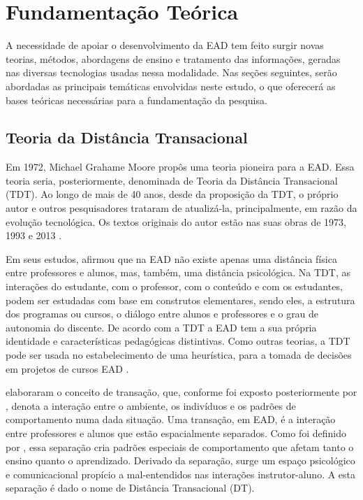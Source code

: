\chapter{Fundamentação Teórica}

A necessidade de apoiar o desenvolvimento da EAD tem feito surgir novas teorias,
métodos, abordagens de ensino e tratamento das informações, geradas nas diversas
tecnologias usadas nessa modalidade. Nas seções seguintes, serão abordadas as
principais temáticas envolvidas neste estudo, o que oferecerá as bases teóricas
necessárias para a fundamentação da pesquisa.

\section{Teoria da Distância Transacional}

Em 1972, Michael Grahame Moore propôs uma teoria pioneira para a EAD. Essa
teoria seria, posteriormente, denominada de Teoria da Distância Transacional
(TDT). Ao longo de mais de 40 anos, desde da proposição da TDT, o próprio
autor e outros pesquisadores trataram de atualizá-la, principalmente, em razão
da evolução tecnológica. Os textos originais do autor estão nas suas obras de
1973, 1993 e 2013 \cite{moore1973transational}.

Em seus estudos,  afirmou que na EAD não existe
apenas uma distância física entre professores e alunos, mas, também, uma
distância psicológica. Na TDT, as interações do estudante, com o professor, com
o conteúdo e com os estudantes, podem ser estudadas com base em construtos
elementares, sendo eles, a estrutura dos programas ou cursos, o diálogo entre
alunos e professores e o grau de autonomia do discente. De acordo com a TDT a
EAD tem a sua própria identidade e características pedagógicas distintivas. Como
outras teorias, a TDT pode ser usada no estabelecimento de uma heurística, para
a tomada de decisões em projetos de cursos EAD \cite{moore2008teoria}.

 elaboraram o conceito de transação, que, conforme
foi exposto posteriormente por , denota a
interação entre o ambiente, os indivíduos e os padrões de comportamento numa
dada situação. Uma transação, em EAD, é a interação entre professores e alunos
que estão espacialmente separados. Como foi definido por
, essa separação cria padrões especiais de
comportamento que afetam tanto o ensino quanto o aprendizado. Derivado da
separação, surge um espaço psicológico e comunicacional propício a
mal-entendidos nas interações instrutor-aluno. A esta separação é dado o nome de
Distância Transacional (DT).

